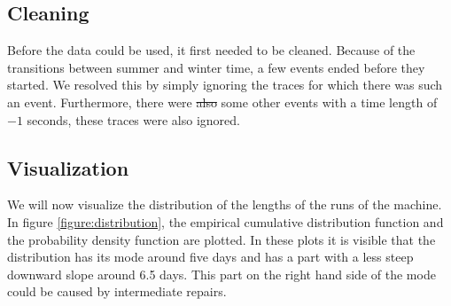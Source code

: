 \documentclass[a4paper]{thesis}
\theoremstyle{definition}
\providecommand{\DIFdeltex}[1]{{\protect\color{red}\sout{#1}}}                      %
\providecommand{\DIFdelbegin}{} %
\providecommand{\DIFdelend}{} %
\providecommand{\DIFdel}[1]{\texorpdfstring{\DIFdeltex{#1}}{}} %
\newcommand{\DIFscaledelfig}{0.5}
\newlength{\DIFdelgraphicswidth} %
\newlength{\DIFdelgraphicsheight} %
\newcommand{\DIFdelincludegraphics}[2][]{%
	\sbox{\DIFdelgraphicsbox}{\DIFOincludegraphics[#1]{#2}}%
	\settoboxwidth{\DIFdelgraphicswidth}{\DIFdelgraphicsbox} %
	\settoboxtotalheight{\DIFdelgraphicsheight}{\DIFdelgraphicsbox} %
	\scalebox{\DIFscaledelfig}{%
		\parbox[b]{\DIFdelgraphicswidth}{\usebox{\DIFdelgraphicsbox}\\[-\baselineskip] \rule{\DIFdelgraphicswidth}{0em}}\llap{\resizebox{\DIFdelgraphicswidth}{\DIFdelgraphicsheight}{%
				\setlength{\unitlength}{\DIFdelgraphicswidth}%
				\begin{picture}(1,1)%
				\thicklines\linethickness{2pt} %
				{\color[rgb]{1,0,0}\put(0,0){\framebox(1,1){}}}%
				{\color[rgb]{1,0,0}\put(0,0){\line( 1,1){1}}}%
				{\color[rgb]{1,0,0}\put(0,1){\line(1,-1){1}}}%
				\end{picture}%
			}\hspace*{3pt}}} %
} %
\DeclareRobustCommand{\DIFdelbegin}{\DIFOdelbegin \let\includegraphics\DIFdelincludegraphics} %
\DeclareRobustCommand{\DIFdelend}{\DIFOaddend \let\includegraphics\DIFOincludegraphics} %
\begin{document}
	\subsection{Cleaning}
	Before the data could be used, it first needed to be cleaned.
	Because of the transitions between summer and winter time, a few events ended before they started.
	We resolved this by simply ignoring the traces for which there was such an event.
	Furthermore, there were \DIFdelbegin \DIFdel{also }\DIFdelend some other events with a time length of $-1$ seconds, these traces were also ignored.
	
	\subsection{Visualization}
	We will now visualize the distribution of the lengths of the runs of the machine.
	In figure \ref{figure:distribution}, the empirical cumulative distribution function and the probability density function are plotted.
	In these plots it is visible that the distribution has its mode around five days and has a part with a less steep downward slope around 6.5 days.
	This part on the right hand side of the mode could be caused by intermediate repairs.
\end{document}
